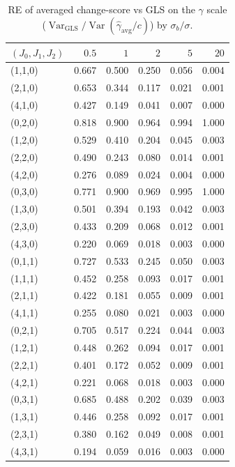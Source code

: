 \documentclass[
  11pt,
]{article}
\begin{document}
\begin{table}

\caption{\label{tab:re-table}RE of averaged change-score vs GLS on the $\gamma$ scale ($\mathop{\mathrm{Var}}_{\text{GLS}} / \mathop{\mathrm{Var}}(\hat\gamma_{\text{avg}}/c)$) by $\sigma_b/\sigma$.}
\centering
\begin{tabular}[t]{lrrrrr}
\toprule
$(J_0,J_1,J_2)$ & $0.5$ & $1$ & $2$ & $5$ & $20$\\
\midrule
(1,1,0) & 0.667 & 0.500 & 0.250 & 0.056 & 0.004\\
(2,1,0) & 0.653 & 0.344 & 0.117 & 0.021 & 0.001\\
(4,1,0) & 0.427 & 0.149 & 0.041 & 0.007 & 0.000\\
(0,2,0) & 0.818 & 0.900 & 0.964 & 0.994 & 1.000\\
(1,2,0) & 0.529 & 0.410 & 0.204 & 0.045 & 0.003\\
\addlinespace
(2,2,0) & 0.490 & 0.243 & 0.080 & 0.014 & 0.001\\
(4,2,0) & 0.276 & 0.089 & 0.024 & 0.004 & 0.000\\
(0,3,0) & 0.771 & 0.900 & 0.969 & 0.995 & 1.000\\
(1,3,0) & 0.501 & 0.394 & 0.193 & 0.042 & 0.003\\
(2,3,0) & 0.433 & 0.209 & 0.068 & 0.012 & 0.001\\
\addlinespace
(4,3,0) & 0.220 & 0.069 & 0.018 & 0.003 & 0.000\\
(0,1,1) & 0.727 & 0.533 & 0.245 & 0.050 & 0.003\\
(1,1,1) & 0.452 & 0.258 & 0.093 & 0.017 & 0.001\\
(2,1,1) & 0.422 & 0.181 & 0.055 & 0.009 & 0.001\\
(4,1,1) & 0.255 & 0.080 & 0.021 & 0.003 & 0.000\\
\addlinespace
(0,2,1) & 0.705 & 0.517 & 0.224 & 0.044 & 0.003\\
(1,2,1) & 0.448 & 0.262 & 0.094 & 0.017 & 0.001\\
(2,2,1) & 0.401 & 0.172 & 0.052 & 0.009 & 0.001\\
(4,2,1) & 0.221 & 0.068 & 0.018 & 0.003 & 0.000\\
(0,3,1) & 0.685 & 0.488 & 0.202 & 0.039 & 0.003\\
\addlinespace
(1,3,1) & 0.446 & 0.258 & 0.092 & 0.017 & 0.001\\
(2,3,1) & 0.380 & 0.162 & 0.049 & 0.008 & 0.001\\
(4,3,1) & 0.194 & 0.059 & 0.016 & 0.003 & 0.000\\
\bottomrule
\end{tabular}
\end{table}
\end{document}
